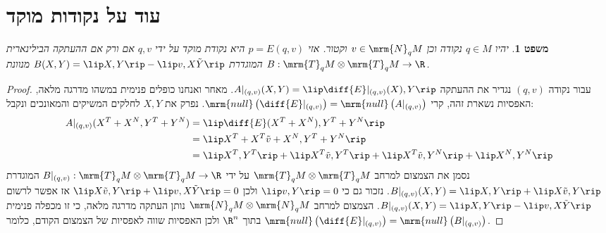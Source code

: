 \documentclass{article}
\newtheorem*{theorem*}{משפט}
\theoremstyle{definition}
\begin{document}
	\section{עוד על נקודות מוקד}
	
	\begin{theorem*}
		יהיו
		\(q\in M\)
		נקודה וכן
		\(v\in\mrm{N}_q M\)
		וקטור.
		אזי
		\(p=E(q,v)\)
		היא נקודת מוקד על ידי
		\(q,v\)
		אם ורק אם ההעתקה הבילינארית
		\(B: \mrm{T}_q M \otimes \mrm{T}_q M \to \R\)
		המוגדרת
		\(B(X,Y) = \lip X,Y \rip - \lip v,X\tilde{Y} \rip\)
		מנוונת.
	\end{theorem*}

	\begin{proof}
		עבור נקודה
		\((q,v)\)
		נגדיר את ההעתקה
		\(A|_{(q,v)}(X,Y)=\lip \diff{E}|_{(q,v)}(X),Y \rip\).
		מאחר ואנחנו כופלים פנימית במשהו מדרגה מלאה, האפסיות נשארת זהה, קרי
		\(
			\mrm{null}\left(\diff{E}|_{(q,v)}\right)
			=\mrm{null}\left(A|_{(q,v)}\right)
		\).
		נפרק את \(X,Y\) לחלקים המשיקים והמאונכים ונקבל:
		\begin{equation*}\begin{split}
			A|_{(q,v)}(X^T+X^N,Y^T+Y^N)
			&= \lip \diff{E}(X^T+X^N),Y^T+Y^N \rip
			\\&= \lip X^T+X^T\tilde{v} +X^N ,Y^T+Y^N \rip
			\\&= \lip X^T,Y^T \rip + \lip X^T\tilde{v},Y^T \rip
			+ \lip X^T\tilde{v},Y^N \rip + \lip X^N,Y^N \rip
		\end{split}\end{equation*}
		נסמן את הצמצום למרחב
		\(\mrm{T}_q M \otimes \mrm{T}_q M\)
		על ידי
		\(B|_{(q,v)}: \mrm{T}_q M \otimes \mrm{T}_q M \to \R\)
		המוגדרת
		\(B|_{(q,v)}(X,Y) = \lip X,Y \rip + \lip X\tilde{v},Y \rip\).
		נזכור גם כי
		\(\lip v,Y \rip=0\)
		ולכן
		\(
			\lip X\tilde{v},Y \rip + \lip v,X\tilde{Y} \rip=0
		\)
		אז אפשר לרשום
		\(B|_{(q,v)}(X,Y) = \lip X,Y \rip - \lip v,X\tilde{Y} \rip\).
		הצמצום למרחב
		\(\mrm{N}_q M \otimes \mrm{N}_q M\)
		נותן העתקה מדרגה מלאה, כי זו מכפלה פנימית בתוך
		\(\R^n\)
		ולכן האפסיות שווה לאפסיות של הצמצום הקודם, כלומר
		\(
			\mrm{null}\left(\diff{E}|_{(q,v)}\right)
			=\mrm{null}\left(B|_{(q,v)}\right)
		\).
	\end{proof}
\end{document}
